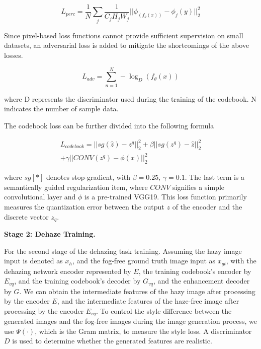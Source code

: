 \documentclass[lettersize,journal]{IEEEtran}
\begin{document}
\begin{equation}
\label{perceptual_loss}
L_ {perc} = \frac{1}{N} \sum_{j} \frac{1}{C_{j}H_{j}W_{j}} || \phi_(f_{\theta}(x)) - \phi_{j}(y)||_{2}^{2}
\end{equation}

Since pixel-based loss functions cannot provide sufficient supervision on small datasets, an adversarial loss is added to mitigate the shortcomings of the above losses\cite{zhu2017unpaired}. 

\begin{equation}
\label{adversarial_loss}
L_{adv} = \sum_{n=1}^{N} - \log_{D} (f_{\theta}(x))
\end{equation}

\noindent where D represents the discriminator used during the training of the codebook. N indicates the number of sample data.


The codebook loss can be further divided into the following formula\cite{chen2022real}

\begin{equation}
\label{codebook_loss}
\begin{split}
	L_ {codebook} = || sg(\widehat{z}) - z^ {q} ||_{2}^{2} + \beta ||sg(z^{q})- \widehat{z}||_{2}^{2} \\
	+ \gamma ||CONV(z^{q}) - \phi(x)||_{2}^{2}
\end{split}
\end{equation}

\noindent where $sg[*]$ denotes stop-gradient, with $\beta = 0.25$, $\gamma = 0.1$. The last term is a semantically guided regularization item, where $CONV$ signifies a simple convolutional layer and $\phi$ is a pre-trained VGG19\cite{simonyan2014very}. This loss function primarily measures the quantization error between the output $z$ of the encoder and the discrete vector $z_{q}$.

{\bf{Stage 2: Dehaze Training.}} 

For the second stage of the dehazing task training. Assuming the hazy image input is denoted as $x_h$, and the fog-free ground truth image input as $x_{gt}$, with the dehazing network encoder represented by $E$, the training codebook's encoder by $E_{vq}$, and the training codebook's decoder by $G_{vq}$, and the enhancement decoder by $G$. We can obtain the intermediate features of the hazy image after processing by the encoder $E$, and the intermediate features of the haze-free image after processing by the encoder $E_{vq}$. To control the style difference between the generated images and the fog-free images during the image generation process, we use $\Psi(\cdot)$, which is the Gram matrix, to measure the style loss\cite{gondal2019unreasonable}. A discriminator $D$ is used to determine whether the generated features are realistic.
\end{document}
